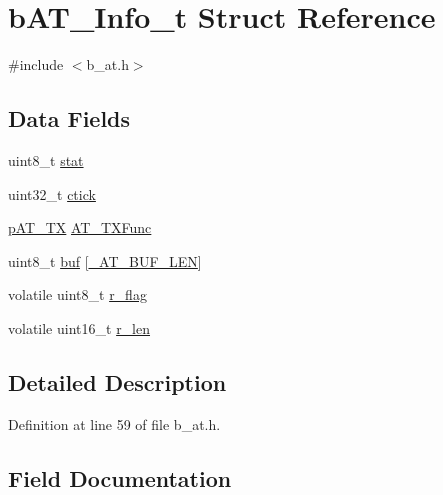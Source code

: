 \hypertarget{structb_a_t___info__t}{}\section{b\+A\+T\+\_\+\+Info\+\_\+t Struct Reference}
\label{structb_a_t___info__t}


{\ttfamily \#include $<$b\+\_\+at.\+h$>$}

\subsection*{Data Fields}
\begin{DoxyCompactItemize}
\item 
uint8\+\_\+t \mbox{\hyperlink{structb_a_t___info__t_a3e0101ab4f197aedba71e5ed14c6bf20}{stat}}
\item 
uint32\+\_\+t \mbox{\hyperlink{structb_a_t___info__t_a50b7ce7bdc57a11d0f9faefb4a81b4cc}{ctick}}
\item 
\mbox{\hyperlink{group___a_t___exported___types_definitions_ga160ea044085772742d8b369ae5af1f8e}{p\+A\+T\+\_\+\+TX}} \mbox{\hyperlink{structb_a_t___info__t_a8d817bb993220791d49f40bf8be191c6}{A\+T\+\_\+\+T\+X\+Func}}
\item 
uint8\+\_\+t \mbox{\hyperlink{structb_a_t___info__t_a83e2127a0a145240c5097d61e2e6f265}{buf}} \mbox{[}\mbox{\hyperlink{b__config_8h_a017d1f392b7b6a5ccc145cda5724cf83}{\+\_\+\+A\+T\+\_\+\+B\+U\+F\+\_\+\+L\+EN}}\mbox{]}
\item 
volatile uint8\+\_\+t \mbox{\hyperlink{structb_a_t___info__t_a8c8ca291d9dc486fd71177e6d987c04f}{r\+\_\+flag}}
\item 
volatile uint16\+\_\+t \mbox{\hyperlink{structb_a_t___info__t_a9fadd39555572d9db701cd13e61d821f}{r\+\_\+len}}
\end{DoxyCompactItemize}


\subsection{Detailed Description}


Definition at line 59 of file b\+\_\+at.\+h.



\subsection{Field Documentation}
\mbox{\label{structb_a_t___info__t_a8d817bb993220791d49f40bf8be191c6}} 
